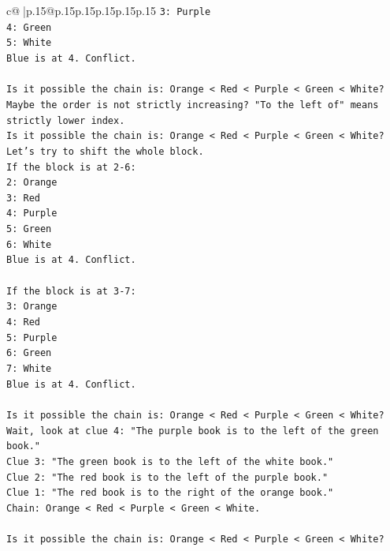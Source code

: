 \documentclass{article}
\begin{document}
{\begin{supertabular}{c@{$\;$}|p{.15\linewidth}@{}p{.15\linewidth}p{.15\linewidth}p{.15\linewidth}p{.15\linewidth}p{.15\linewidth}}
{{{\texttt{3: Purple} \\
\texttt{4: Green} \\
\texttt{5: White} \\
\texttt{Blue is at 4. Conflict.} \\
\\ 
\texttt{Is it possible the chain is: Orange < Red < Purple < Green < White?} \\
\texttt{Maybe the order is not strictly increasing? "To the left of" means strictly lower index.} \\
\texttt{Is it possible the chain is: Orange < Red < Purple < Green < White?} \\
\texttt{Let's try to shift the whole block.} \\
\texttt{If the block is at 2{-}6:} \\
\texttt{2: Orange} \\
\texttt{3: Red} \\
\texttt{4: Purple} \\
\texttt{5: Green} \\
\texttt{6: White} \\
\texttt{Blue is at 4. Conflict.} \\
\\ 
\texttt{If the block is at 3{-}7:} \\
\texttt{3: Orange} \\
\texttt{4: Red} \\
\texttt{5: Purple} \\
\texttt{6: Green} \\
\texttt{7: White} \\
\texttt{Blue is at 4. Conflict.} \\
\\ 
\texttt{Is it possible the chain is: Orange < Red < Purple < Green < White?} \\
\texttt{Wait, look at clue 4: "The purple book is to the left of the green book."} \\
\texttt{Clue 3: "The green book is to the left of the white book."} \\
\texttt{Clue 2: "The red book is to the left of the purple book."} \\
\texttt{Clue 1: "The red book is to the right of the orange book."} \\
\texttt{Chain: Orange < Red < Purple < Green < White.} \\
\\ 
\texttt{Is it possible the chain is: Orange < Red < Purple < Green < White?} \\
}}}
\end{supertabular}}
\end{document}
